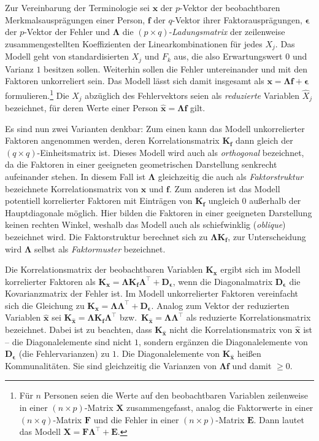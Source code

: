 Zur Vereinbarung der Terminologie sei $\bm{x}$ der $p$-Vektor der beobachtbaren Merkmalsausprägungen einer Person, $\bm{f}$ der $q$-Vektor ihrer Faktorausprägungen, $\bm{\epsilon}$ der $p$-Vektor der Fehler und $\bm{\Lambda}$ die $(p \times q)$-\emph{Ladungsmatrix} der zeilenweise zusammengestellten Koeffizienten der Linearkombinationen für jedes $X_{j}$. Das Modell geht von standardisierten $X_{j}$ und $F_{k}$ aus, die also Erwartungswert $0$ und Varianz $1$ besitzen sollen. Weiterhin sollen die Fehler untereinander und mit den Faktoren unkorreliert sein. Das Modell lässt sich damit insgesamt als $\bm{x} = \bm{\Lambda} \bm{f} + \bm{\epsilon}$ formulieren.\footnote{Für $n$ Personen seien die Werte auf den beobachtbaren Variablen zeilenweise in einer $(n \times p)$-Matrix $\bm{X}$ zusammengefasst, analog die Faktorwerte in einer $(n \times q)$-Matrix $\bm{F}$ und die Fehler in einer $(n \times p)$-Matrix $\bm{E}$. Dann lautet das Modell $\bm{X} = \bm{F} \bm{\Lambda}^{\top} + \bm{E}$.} Die $X_{j}$ abzüglich des Fehlervektors seien als \emph{reduzierte} Variablen $\hat{X}_{j}$ bezeichnet, für deren Werte einer Person $\hat{\bm{x}} = \bm{\Lambda} \bm{f}$ gilt.

Es sind nun zwei Varianten denkbar: Zum einen kann das Modell unkorrelierter Faktoren angenommen werden, deren Korrelationsmatrix $\bm{K}_{\bm{f}}$ dann gleich der $(q \times q)$-Einheitsmatrix ist. Dieses Modell wird auch als \emph{orthogonal} bezeichnet, da die Faktoren in einer geeigneten geometrischen Darstellung senkrecht aufeinander stehen. In diesem Fall ist $\bm{\Lambda}$ gleichzeitig die auch als \emph{Faktorstruktur} bezeichnete Korrelationsmatrix von $\bm{x}$ und $\bm{f}$. Zum anderen ist das Modell potentiell korrelierter Faktoren mit Einträgen von $\bm{K}_{\bm{f}}$ ungleich $0$ außerhalb der Hauptdiagonale möglich. Hier bilden die Faktoren in einer geeigneten Darstellung keinen rechten Winkel, weshalb das Modell auch als schiefwinklig (\emph{oblique}) bezeichnet wird. Die Faktorstruktur berechnet sich zu $\bm{\Lambda} \bm{K}_{\bm{f}}$, zur Unterscheidung wird $\bm{\Lambda}$ selbst als \emph{Faktormuster} bezeichnet.

Die Korrelationsmatrix der beobachtbaren Variablen $\bm{K}_{\bm{x}}$ ergibt sich im Modell korrelierter Faktoren als $\bm{K}_{\bm{x}} = \bm{\Lambda} \bm{K}_{\bm{f}} \bm{\Lambda}^{\top} + \bm{D}_{\bm{\epsilon}}$, wenn die Diagonalmatrix $\bm{D}_{\bm{\epsilon}}$ die Kovarianzmatrix der Fehler ist. Im Modell unkorrelierter Faktoren vereinfacht sich die Gleichung zu $\bm{K}_{\bm{x}} = \bm{\Lambda} \bm{\Lambda}^{\top} + \bm{D}_{\bm{\epsilon}}$. Analog zum Vektor der reduzierten Variablen $\hat{\bm{x}}$ sei $\bm{K}_{\hat{\bm{x}}} = \bm{\Lambda} \bm{K}_{\bm{f}} \bm{\Lambda}^{\top}$ bzw.\ $\bm{K}_{\hat{\bm{x}}} = \bm{\Lambda} \bm{\Lambda}^{\top}$ als reduzierte Korrelationsmatrix bezeichnet. Dabei ist zu beachten, dass $\bm{K}_{\hat{\bm{x}}}$ nicht die Korrelationsmatrix von $\hat{\bm{x}}$ ist -- die Diagonalelemente sind nicht $1$, sondern ergänzen die Diagonalelemente von $\bm{D}_{\bm{\epsilon}}$ (die Fehlervarianzen) zu $1$. Die Diagonalelemente von $\bm{K}_{\hat{\bm{x}}}$ heißen Kommunalitäten. Sie sind gleichzeitig die Varianzen von $\bm{\Lambda} \bm{f}$ und damit $\geq 0$.

